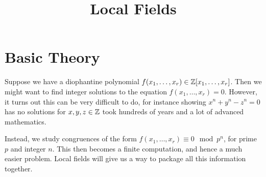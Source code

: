 \documentclass[10pt,a4paper]{article}
\title{Local Fields}
\begin{document}
\maketitle
\tableofcontents\newpage
\section{Basic Theory}
Suppose we have a diophantine polynomial $f(x_1, \ldots, x_r) \in \mathbb{Z}[x_1, \ldots, x_r]$. Then we might want to find integer solutions to the equation $f(x_1, \ldots, x_r) = 0$. However, it turns out this can be very difficult to do, for instance showing $x^n + y^n - z^n = 0$ has no solutions for $x,y,z \in \mathbb{Z}$ took hundreds of years and a lot of advanced mathematics.

Instead, we study congruences of the form $f(x_1, \ldots, x_r) \equiv 0 \mod p^n$, for prime $p$ and integer $n$. This then becomes a finite computation, and hence a much easier problem. Local fields will give us a way to package all this information together.
\end{document}
